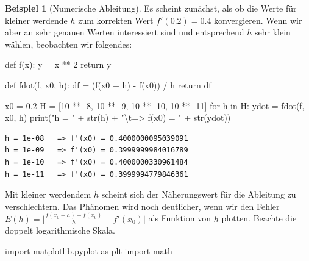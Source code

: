 \documentclass[
  a4paper,
  DIV=11]{scrreprt}
\newenvironment{Shaded}{\begin{snugshade}}{\end{snugshade}}
\newcommand{\BuiltInTok}[1]{\textcolor[rgb]{0.00,0.23,0.31}{#1}}
\newcommand{\CharTok}[1]{\textcolor[rgb]{0.13,0.47,0.30}{#1}}
\newcommand{\ControlFlowTok}[1]{\textcolor[rgb]{0.00,0.23,0.31}{#1}}
\newcommand{\DecValTok}[1]{\textcolor[rgb]{0.68,0.00,0.00}{#1}}
\newcommand{\FloatTok}[1]{\textcolor[rgb]{0.68,0.00,0.00}{#1}}
\newcommand{\ImportTok}[1]{\textcolor[rgb]{0.00,0.46,0.62}{#1}}
\newcommand{\KeywordTok}[1]{\textcolor[rgb]{0.00,0.23,0.31}{#1}}
\newcommand{\NormalTok}[1]{\textcolor[rgb]{0.00,0.23,0.31}{#1}}
\newcommand{\OperatorTok}[1]{\textcolor[rgb]{0.37,0.37,0.37}{#1}}
\newcommand{\StringTok}[1]{\textcolor[rgb]{0.13,0.47,0.30}{#1}}
\theoremstyle{definition}
\theoremstyle{definition}
\newtheorem{example}{Beispiel}[chapter]
\theoremstyle{remark}
\begin{document}
\begin{example}[Numerische
Ableitung]
Es scheint zunächst, als ob die Werte für kleiner werdende \(h\) zum
korrekten Wert \(f'(0.2)=0.4\) konvergieren. Wenn wir aber an sehr
genauen Werten interessiert sind und entsprechend \(h\) sehr klein
wählen, beobachten wir folgendes:

\begin{Shaded}
\begin{Highlighting}[]
\KeywordTok{def}\NormalTok{ f(x):}
\NormalTok{    y }\OperatorTok{=}\NormalTok{ x }\OperatorTok{**} \DecValTok{2}
    \ControlFlowTok{return}\NormalTok{ y}

\KeywordTok{def}\NormalTok{ fdot(f, x0, h):}
\NormalTok{    df }\OperatorTok{=}\NormalTok{ (f(x0 }\OperatorTok{+}\NormalTok{ h) }\OperatorTok{{-}}\NormalTok{ f(x0)) }\OperatorTok{/}\NormalTok{ h}
    \ControlFlowTok{return}\NormalTok{ df}

\NormalTok{x0 }\OperatorTok{=} \FloatTok{0.2}
\NormalTok{H }\OperatorTok{=}\NormalTok{ [}\DecValTok{10} \OperatorTok{**} \OperatorTok{{-}}\DecValTok{8}\NormalTok{, }\DecValTok{10} \OperatorTok{**} \OperatorTok{{-}}\DecValTok{9}\NormalTok{, }\DecValTok{10} \OperatorTok{**} \OperatorTok{{-}}\DecValTok{10}\NormalTok{, }\DecValTok{10} \OperatorTok{**} \OperatorTok{{-}}\DecValTok{11}\NormalTok{]}
\ControlFlowTok{for}\NormalTok{ h }\KeywordTok{in}\NormalTok{ H:}
\NormalTok{    ydot }\OperatorTok{=}\NormalTok{ fdot(f, x0, h)}
    \BuiltInTok{print}\NormalTok{(}\StringTok{"h = "} \OperatorTok{+} \BuiltInTok{str}\NormalTok{(h) }\OperatorTok{+} \StringTok{"}\CharTok{\textbackslash{}t}\StringTok{=\textgreater{} f\textquotesingle{}(x0) = "} \OperatorTok{+} \BuiltInTok{str}\NormalTok{(ydot))}
\end{Highlighting}
\end{Shaded}

\begin{verbatim}
h = 1e-08   => f'(x0) = 0.4000000095039091
h = 1e-09   => f'(x0) = 0.3999999984016789
h = 1e-10   => f'(x0) = 0.4000000330961484
h = 1e-11   => f'(x0) = 0.3999994779846361
\end{verbatim}

Mit kleiner werdendem \(h\) scheint sich der Näherungswert für die
Ableitung zu verschlechtern. Das Phänomen wird noch deutlicher, wenn wir
den Fehler \(E(h) = \lvert\frac{f(x_0+h)-f(x_0)}{h} - f'(x_0)\rvert\)
als Funktion von \(h\) plotten. Beachte die doppelt logarithmische
Skala.

\begin{Shaded}
\begin{Highlighting}[]
\ImportTok{import}\NormalTok{ matplotlib.pyplot }\ImportTok{as}\NormalTok{ plt}
\ImportTok{import}\NormalTok{ math}


\end{Highlighting}
\end{Shaded}
\end{example}
\end{document}
